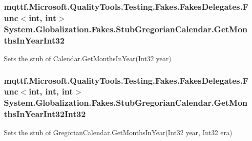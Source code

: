 \hypertarget{class_system_1_1_globalization_1_1_fakes_1_1_stub_gregorian_calendar_ad6bdfd8688505ec4340e3967b56754a0}{
\subsubsection[{Get\-Months\-In\-Year\-Int32}]{\setlength{\rightskip}{0pt plus 5cm}mqttf.\-Microsoft.\-Quality\-Tools.\-Testing.\-Fakes.\-Fakes\-Delegates.\-Func$<$int, int$>$ System.\-Globalization.\-Fakes.\-Stub\-Gregorian\-Calendar.\-Get\-Months\-In\-Year\-Int32}}\label{class_system_1_1_globalization_1_1_fakes_1_1_stub_gregorian_calendar_ad6bdfd8688505ec4340e3967b56754a0}


Sets the stub of Calendar.\-Get\-Months\-In\-Year(\-Int32 year)

\hypertarget{class_system_1_1_globalization_1_1_fakes_1_1_stub_gregorian_calendar_a32d722d7d5656e3527022a2bece3e5a1}{
\subsubsection[{Get\-Months\-In\-Year\-Int32\-Int32}]{\setlength{\rightskip}{0pt plus 5cm}mqttf.\-Microsoft.\-Quality\-Tools.\-Testing.\-Fakes.\-Fakes\-Delegates.\-Func$<$int, int, int$>$ System.\-Globalization.\-Fakes.\-Stub\-Gregorian\-Calendar.\-Get\-Months\-In\-Year\-Int32\-Int32}}\label{class_system_1_1_globalization_1_1_fakes_1_1_stub_gregorian_calendar_a32d722d7d5656e3527022a2bece3e5a1}


Sets the stub of Gregorian\-Calendar.\-Get\-Months\-In\-Year(\-Int32 year, Int32 era)

